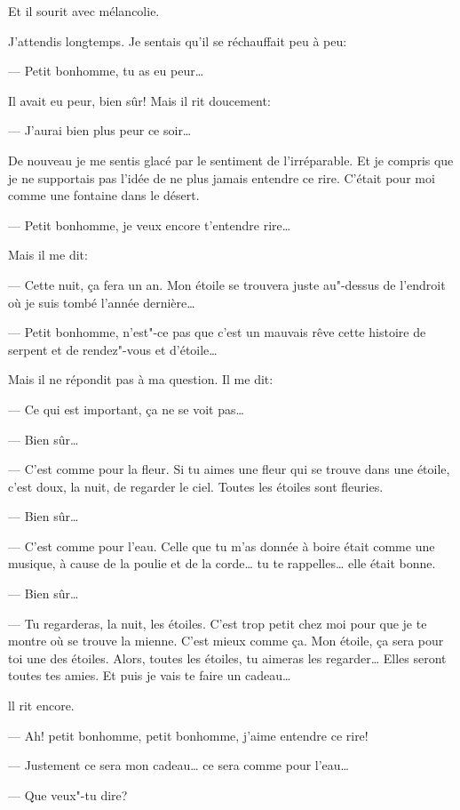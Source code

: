 \begin{Parallel}[p]{}{}
{Et il sourit avec mélancolie.

J'attendis longtemps. Je sentais qu'il se réchauffait peu à peu:

--- Petit bonhomme, tu as eu peur\ldots{}

Il avait eu peur, bien sûr! Mais il rit doucement:

--- J'aurai bien plus peur ce soir\ldots{}

De nouveau je me sentis glacé par le sentiment de l'irréparable. Et je compris
que je ne supportais pas l'idée de ne plus jamais entendre ce rire. C'était
pour moi comme une fontaine dans le désert.

--- Petit bonhomme, je veux encore t'entendre rire\ldots{}

Mais il me dit:

--- Cette nuit, ça fera un an. Mon étoile se trouvera juste au"-dessus de
l'endroit où je suis tombé l'année dernière\ldots{}

--- Petit bonhomme, n'est"-ce pas que c'est un mauvais rêve cette histoire de
serpent et de rendez"-vous et d'étoile\ldots{}

Mais il ne répondit pas à ma question. Il me dit:

--- Ce qui est important, ça ne se voit pas\ldots{}

--- Bien sûr\ldots{}

--- C'est comme pour la fleur. Si tu aimes une fleur qui se trouve dans une
étoile, c'est doux, la nuit, de regarder le ciel. Toutes les étoiles sont
fleuries.

--- Bien sûr\ldots{}

--- C'est comme pour l'eau. Celle que tu m'as donnée à boire était comme une
musique, à cause de la poulie et de la corde\ldots{} tu te rappelles\ldots{}
elle était bonne.

--- Bien sûr\ldots{}

--- Tu regarderas, la nuit, les étoiles. C'est trop petit chez moi pour que
je te montre où se trouve la mienne. C'est mieux comme ça. Mon étoile, ça
sera pour toi une des étoiles. Alors, toutes les étoiles, tu aimeras les
regarder\ldots{} Elles seront toutes tes amies. Et puis je vais te faire un
cadeau\ldots{}

ll rit encore.

--- Ah! petit bonhomme, petit bonhomme, j'aime entendre ce rire!

--- Justement ce sera mon cadeau\ldots{} ce sera comme pour l'eau\ldots{}

--- Que veux"-tu dire?

}
\end{Parallel}
